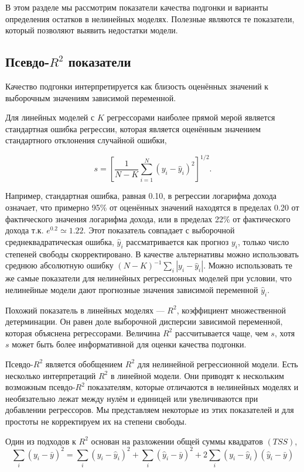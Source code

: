 В этом разделе мы рассмотрим показатели качества подгонки и варианты определения остатков в нелинейных моделях. Полезные являются те показатели, который позволяют выявить недостатки модели.

\subsection{Псевдо-$R^2$ показатели}

Качество подгонки интерпретируется как близость оценённых значений к выборочным значениям зависимой переменной. 

Для линейных моделей с $K$ регрессорами наиболее прямой мерой является стандартная ошибка регрессии, которая является оценённым значением стандартного отклонения случайной ошибки,

\[
s = \left[ \frac{1}{N - K} \sum_{i=1}^N (y_i - \hat{y}_i)^2 \right]^{1/2}.
\]

Например, стандартная ошибка, равная 0.10, в регрессии логарифма дохода означает, что примерно 95\% от оценённых значений находятся в пределах 0.20 от фактического значения логарифма дохода, или в пределах 22\% от фактического дохода т.к. $e^{0.2} \simeq 1.22$. Этот показатель совпадает с выборочной среднеквадратическая ошибка, $\hat{y}_i$ рассматривается как прогноз $y_i$, только число степеней свободы скорректировано. В качестве альтернативы можно использовать среднюю абсолютную ошибку $(N - K)^{-1}\sum_i |y_i - \hat{y}_i|$. Можно использовать те же самые показатели для нелинейных регрессионных моделей при условии, что нелинейные модели дают прогнозные значения зависимой переменной $\hat{y}_i$.

Похожий показатель в линейных моделях --- $R^2$, коэффициент множественной детерминации. Он равен доле выборочной дисперсии зависимой переменной, которая объяснена регрессорами. Величина $R^2$ рассчитывается чаще, чем $s$, хотя $s$ может быть более информативной для оценки качества подгонки.

Псевдо-$R^2$ является обобщением $R^2$ для нелинейной регрессионной модели. Есть несколько интерпретаций $R^2$ в линейной модели. Они приводят к нескольким возможным псевдо-$R^2$ показателям, которые отличаются в нелинейных моделях и необязательно  лежат между нулём и единицей или увеличиваются при добавлении регрессоров. Мы представляем некоторые из этих показателей и  для простоты не корректируем их на степени свободы.

Один из подходов к $R^2$ основан на  разложении общей суммы квадратов $(TSS)$, 
\[
\sum_{i} (y_i - \bar{y})^2 = \sum_{i} (y_i - \hat{y}_i)^2 + \sum_{i} (\hat{y}_i - \bar{y})^2 + 2\sum_{i} (y_i - \hat{y}_i)(\hat{y}_i - \bar{y})
\]

